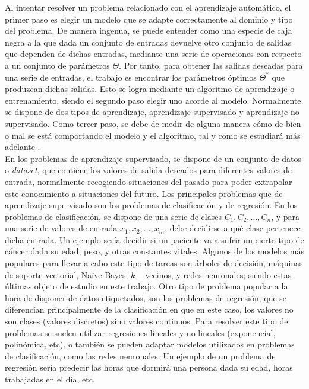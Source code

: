 	Al intentar resolver un problema relacionado con el aprendizaje automático, el primer paso es elegir un modelo que se adapte correctamente al dominio y tipo del problema. De manera ingenua, se puede entender como una especie de caja negra a la que dada un conjunto de entradas devuelve otro conjunto de salidas que dependen de dichas entradas, mediante una serie de operaciones con respecto a un conjunto de parámetros $\Theta$. Por tanto, para obtener las salidas deseadas para una serie de entradas, el trabajo es encontrar los parámetros óptimos $\Theta^*$ que produzcan dichas salidas. Esto se logra mediante un algoritmo de aprendizaje o entrenamiento, siendo el segundo paso elegir uno acorde al modelo. Normalmente se dispone de dos tipos de aprendizaje, aprendizaje supervisado y aprendizaje no supervisado. Como tercer paso, se debe de medir de alguna manera cómo de bien o mal se está comportando el modelo y el algoritmo, tal y como se estudiará más adelante \cite{Szeliski}. \\
	
	En los problemas de aprendizaje supervisado, se dispone de un conjunto de datos o \textit{dataset}, que contiene los valores de salida deseados para diferentes valores de entrada, normalmente recogiendo situaciones del pasado para poder extrapolar este conocimiento a situaciones del futuro. Los principales problemas que de aprendizaje supervisado son los problemas de clasificación y de regresión. En los problemas de clasificación, se dispone de una serie de clases $C_1, C_2, \hdots, C_n$, y para una serie de valores de entrada $x_1, x_2, \hdots, x_m$, debe decidirse a qué clase pertenece dicha entrada. Un ejemplo sería decidir si un paciente va a sufrir un cierto tipo de cáncer dada su edad, peso, y otras constantes vitales. Algunos de los modelos más populares para llevar a cabo este tipo de tareas son árboles de decisión, máquinas de soporte vectorial, Naïve Bayes, $k-$vecinos, y redes neuronales; siendo estas últimas objeto de estudio en este trabajo. Otro tipo de problema popular a la hora de disponer de datos etiquetados, son los problemas de regresión, que se diferencian principalmente de la clasificación en que en este caso, los valores no son clases (valores discretos) sino valores continuos. Para resolver este tipo de problemas se suelen utilizar regresiones lineales y no lineales (exponencial, polinómica, etc), o también se pueden adaptar modelos utilizados en problemas de clasificación, como las redes neuronales. Un ejemplo de un problema de regresión sería predecir las horas que dormirá una persona dada su edad, horas trabajadas en el día, etc. \\
	

